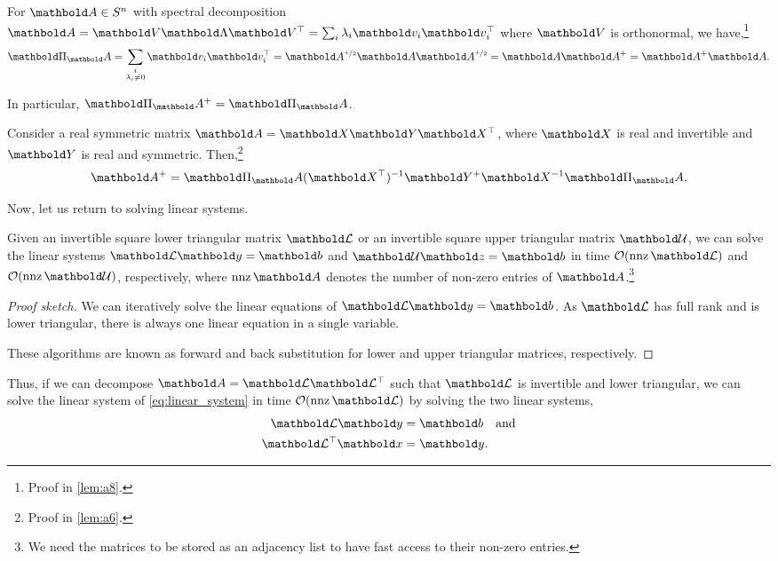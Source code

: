 \begin{lem}
For $\mA \in \sS^n$ with spectral decomposition $\mA = \mV\mLambda\trans{\mV} = \sum_i \lambda_i \vv_i \trans{\vv_i}$ where $\mV$ is orthonormal, we have,\footnote{Proof in \cref{lem:a8}.} \begin{align}
    \mPi_\mA = \sum_{\substack{i \\ \lambda_i \neq 0}} \vv_i \trans{\vv_i} = \mA^{\nicefrac{+}{2}}\mA\mA^{\nicefrac{+}{2}} = \mA\pinv{\mA} = \pinv{\mA}\mA.
\end{align}
\end{lem}

\begin{cor}
In particular, $\pinv{\mPi_\mA} = \mPi_\mA$.
\end{cor}

\begin{lem} Consider a real symmetric matrix $\mA = \mX\mY\trans{\mX}$, where $\mX$ is real and invertible and $\mY$ is real and symmetric. Then,\footnote{Proof in \cref{lem:a6}.} \begin{align}
    \pinv{\mA} = \mPi_\mA\inv{(\trans{\mX})}\pinv{\mY}\inv{\mX}\mPi_\mA. \label{eq:pinv_calculation}
\end{align}
\end{lem}

Now, let us return to solving linear systems.

\begin{lem}
Given an invertible square lower triangular matrix $\mCalL$ or an invertible square upper triangular matrix $\mCalU$, we can solve the linear systems $\mCalL\vy = \vb$ and $\mCalU\vz = \vb$ in time $\LandauO{\nnz{\mCalL}}$ and $\LandauO{\nnz{\mCalU}}$, respectively, where $\nnz{\mA}$ denotes the number of non-zero entries of $\mA$.\footnote{We need the matrices to be stored as an adjacency list to have fast access to their non-zero entries.}
\end{lem}\begin{proof}[Proof sketch] We can iteratively solve the linear equations of $\mCalL\vy = \vb$. As $\mCalL$ has full rank and is lower triangular, there is always one linear equation in a single variable.

These algorithms are known as forward and back substitution for lower and upper triangular matrices, respectively.
\end{proof}

Thus, if we can decompose $\mA = \mCalL\trans{\mCalL}$ such that $\mCalL$ is invertible and lower triangular, we can solve the linear system of \cref{eq:linear_system} in time $\LandauO{\nnz{\mCalL}}$ by solving the two linear systems, \begin{align}
    \mCalL\vy &= \vb \quad\text{and} \\
    \trans{\mCalL}\vx &= \vy.
\end{align}

